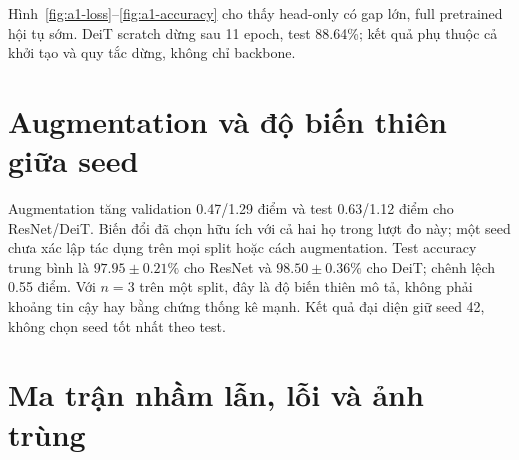 Hình~\ref{fig:a1-loss}--\ref{fig:a1-accuracy} cho thấy head-only có gap lớn,
full pretrained hội tụ sớm. DeiT scratch dừng sau 11 epoch, test 88.64\%;
kết quả phụ thuộc cả khởi tạo và quy tắc dừng, không chỉ backbone.

\section{Augmentation và độ biến thiên giữa seed}
Augmentation tăng validation 0.47/1.29 điểm và test 0.63/1.12 điểm
cho ResNet/DeiT. Biến đổi đã chọn hữu ích với cả hai họ trong lượt đo
này; một seed chưa xác lập tác dụng trên mọi split hoặc cách augmentation.
Test accuracy trung bình là $97.95\pm 0.21\%$ cho ResNet và
$98.50\pm 0.36\%$ cho DeiT; chênh lệch 0.55 điểm. Với $n=3$ trên một
split, đây là độ biến thiên mô tả, không phải khoảng tin cậy hay bằng chứng thống kê mạnh.
Kết quả đại diện giữ seed 42, không chọn seed tốt nhất theo test.

\section{Ma trận nhầm lẫn, lỗi và ảnh trùng}

